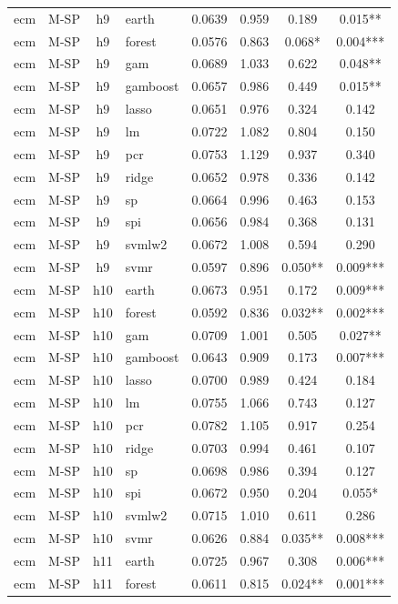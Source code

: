 \begin{ThreePartTable}
\begin{longtable}[t]{llclcccc}
\addlinespace
ecm & M-SP & h9 & earth & 0.0639 & 0.959 & 0.189 & 0.015**\\
ecm & M-SP & h9 & forest & 0.0576 & 0.863 & 0.068* & 0.004***\\
ecm & M-SP & h9 & gam & 0.0689 & 1.033 & 0.622 & 0.048**\\
ecm & M-SP & h9 & gamboost & 0.0657 & 0.986 & 0.449 & 0.015**\\
ecm & M-SP & h9 & lasso & 0.0651 & 0.976 & 0.324 & 0.142\\
ecm & M-SP & h9 & lm & 0.0722 & 1.082 & 0.804 & 0.150\\
ecm & M-SP & h9 & pcr & 0.0753 & 1.129 & 0.937 & 0.340\\
ecm & M-SP & h9 & ridge & 0.0652 & 0.978 & 0.336 & 0.142\\
ecm & M-SP & h9 & sp & 0.0664 & 0.996 & 0.463 & 0.153\\
ecm & M-SP & h9 & spi & 0.0656 & 0.984 & 0.368 & 0.131\\
ecm & M-SP & h9 & svmlw2 & 0.0672 & 1.008 & 0.594 & 0.290\\
ecm & M-SP & h9 & svmr & 0.0597 & 0.896 & 0.050** & 0.009***\\
\addlinespace
ecm & M-SP & h10 & earth & 0.0673 & 0.951 & 0.172 & 0.009***\\
ecm & M-SP & h10 & forest & 0.0592 & 0.836 & 0.032** & 0.002***\\
ecm & M-SP & h10 & gam & 0.0709 & 1.001 & 0.505 & 0.027**\\
ecm & M-SP & h10 & gamboost & 0.0643 & 0.909 & 0.173 & 0.007***\\
ecm & M-SP & h10 & lasso & 0.0700 & 0.989 & 0.424 & 0.184\\
ecm & M-SP & h10 & lm & 0.0755 & 1.066 & 0.743 & 0.127\\
ecm & M-SP & h10 & pcr & 0.0782 & 1.105 & 0.917 & 0.254\\
ecm & M-SP & h10 & ridge & 0.0703 & 0.994 & 0.461 & 0.107\\
ecm & M-SP & h10 & sp & 0.0698 & 0.986 & 0.394 & 0.127\\
ecm & M-SP & h10 & spi & 0.0672 & 0.950 & 0.204 & 0.055*\\
ecm & M-SP & h10 & svmlw2 & 0.0715 & 1.010 & 0.611 & 0.286\\
ecm & M-SP & h10 & svmr & 0.0626 & 0.884 & 0.035** & 0.008***\\
\addlinespace
ecm & M-SP & h11 & earth & 0.0725 & 0.967 & 0.308 & 0.006***\\
ecm & M-SP & h11 & forest & 0.0611 & 0.815 & 0.024** & 0.001***\\

\end{longtable}
\end{ThreePartTable}
